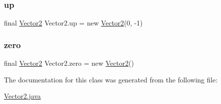 \subsubsection{\texorpdfstring{up}{up}}
{\footnotesize\ttfamily final \mbox{\hyperlink{class_vector2}{Vector2}} Vector2.\+up = new \mbox{\hyperlink{class_vector2}{Vector2}}(0, -\/1)\hspace{0.3cm}{\ttfamily [static]}}

\mbox{\label{class_vector2_a0eb5cdb3286a9ed344e9f193a67662c1}} 
\subsubsection{\texorpdfstring{zero}{zero}}
{\footnotesize\ttfamily final \mbox{\hyperlink{class_vector2}{Vector2}} Vector2.\+zero = new \mbox{\hyperlink{class_vector2}{Vector2}}()\hspace{0.3cm}{\ttfamily [static]}}



The documentation for this class was generated from the following file\+:\begin{DoxyCompactItemize}
\item 
\mbox{\hyperlink{_vector2_8java}{Vector2.\+java}}\end{DoxyCompactItemize}
